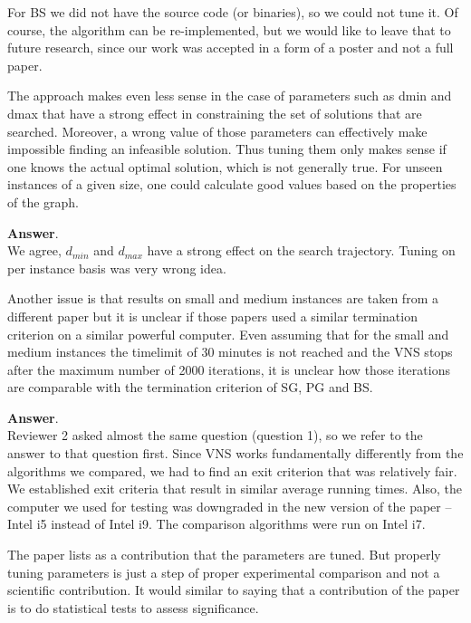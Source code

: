 \documentclass [11pt]{scrartcl}
\begin{document}
For BS we did not have the source code (or binaries), so we could not tune it.
Of course, the algorithm can be re-implemented, but we would like to leave that to future research, since our work was accepted in a form of   a poster and not a full paper.

\begin{leftbar}
The approach makes even less sense in the case of parameters such as dmin and dmax that have a strong effect in constraining the set of solutions that are searched. Moreover, a wrong value of those parameters can effectively make impossible finding an infeasible solution. Thus tuning them only makes sense if one knows the actual optimal solution, which is not generally true. For unseen instances of a given size, one could calculate good values based on the properties of the graph.	
\end{leftbar}

\textbf{Answer}. \\
We agree, $d_{min}$ and $d_{max}$ have a strong effect on the search trajectory.  Tuning on per instance basis was very wrong idea. 


\begin{leftbar}
Another issue is that results on small and medium instances are taken from a different paper but it is unclear if those papers used a similar termination criterion on a similar powerful computer. Even assuming that for the small and medium instances the timelimit of 30 minutes is not reached and the VNS stops after the maximum number of 2000 iterations, it is unclear how those iterations are comparable with the termination criterion of SG, PG and BS.
\end{leftbar}

\textbf{Answer}.\\
Reviewer 2 asked almost the same question (question 1), so we refer to   the answer to that question first.
Since VNS works fundamentally differently from the algorithms we compared, we had to find an exit criterion that was relatively fair. We established exit criteria that result in similar average running times. Also, the computer we used for testing was downgraded in the new version of the paper -- Intel i5 instead of Intel i9. The comparison algorithms were run on Intel i7.

\begin{leftbar}
The paper lists as a contribution that the parameters are tuned. But properly tuning parameters is just a step of proper experimental comparison and not a scientific contribution. It would similar to saying that a contribution of the paper is to do statistical tests to assess significance.
\end{leftbar}
\end{document}
